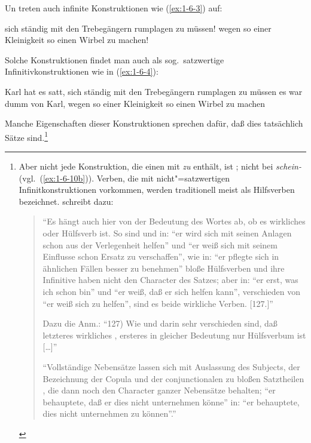 \documentclass[output=paper]{langsci/langscibook}
\begin{document}
Un treten auch infinite Konstruktionen wie (\ref{ex:1-6-3}) auf:
\begin{exe}
\ex\label{ex:1-6-3}
\begin{xlist}
\ex\label{ex:1-6-3a} sich ständig mit den Trebegängern rumplagen zu müssen!
\ex\label{ex:1-6-3b} wegen so einer Kleinigkeit so einen Wirbel zu machen!
\end{xlist}
\end{exe}
Solche Konstruktionen findet man auch  als sog.\ satzwertige Infinitivkonstruktionen wie in (\ref{ex:1-6-4}):
\begin{exe}
\ex\label{ex:1-6-4}
\begin{xlist}
\ex\label{ex:1-6-4a} Karl hat es satt, sich ständig mit den Trebegängern rumplagen zu müssen
\ex\label{ex:1-6-4b} es war dumm von Karl, wegen so einer Kleinigkeit so einen Wirbel zu machen
\end{xlist}
\end{exe}
\addlines
Manche Eigenschaften dieser Konstruktionen sprechen dafür, daß dies
tatsächlich Sätze sind.\footnote{%
  Aber nicht jede Konstruktion, die
  einen  mit \textit{zu} enthält, ist ; \zb nicht bei
  \textit{schein-} (vgl.\ (\ref{ex:1-6-10b})). Verben, die mit
  nicht"=satzwertigen Infinitkonstruktionen vorkommen, werden
  traditionell meist als Hilfsverben bezeichnet. \citet{Herling1828}
  schreibt dazu: 
  \begin{quote}
  "`Es hängt auch hier von der Bedeutung des Wortes ab,
  ob es wirkliches  oder Hülfsverb ist. So sind  und
   in: "`er wird sich mit seinen Anlagen schon aus der
  Verlegenheit helfen"' und "`er weiß sich mit seinem Einflusse schon
  Ersatz zu verschaffen"', wie  in: "`er pflegte sich in
  ähnlichen Fällen besser zu benehmen"' bloße Hülfsverben und ihre
  Infinitive haben nicht den Character des Satzes; aber in: "`er
   erst, was ich schon bin"' und "`er weiß, daß er sich helfen
  kann"', verschieden von "`er weiß sich zu helfen"', sind es beide
  wirkliche Verben. [127.]"' \citep[206]{Herling1828}

  Dazu die Anm.: "`127) Wie
   und  darin sehr verschieden sind, daß
  letzteres wirkliches , ersteres in gleicher Bedeutung nur
  Hülfsverbum ist [\ldots]"' \citep[345]{Herling1828}

  "`Vollständige Nebensätze lassen sich mit
  Auslassung des Subjects, der Bezeichnung der Copula und der
  conjunctionalen  zu bloßen Satztheilen , die
  dann noch den Character ganzer Nebensätze behalten; \zb "`er
  behauptete, daß er dies nicht unternehmen könne"' in: "`er behauptete,
  dies nicht unternehmen zu können"'."' \citep[206f]{Herling1828}
\end{quote}%
}
\end{document}
